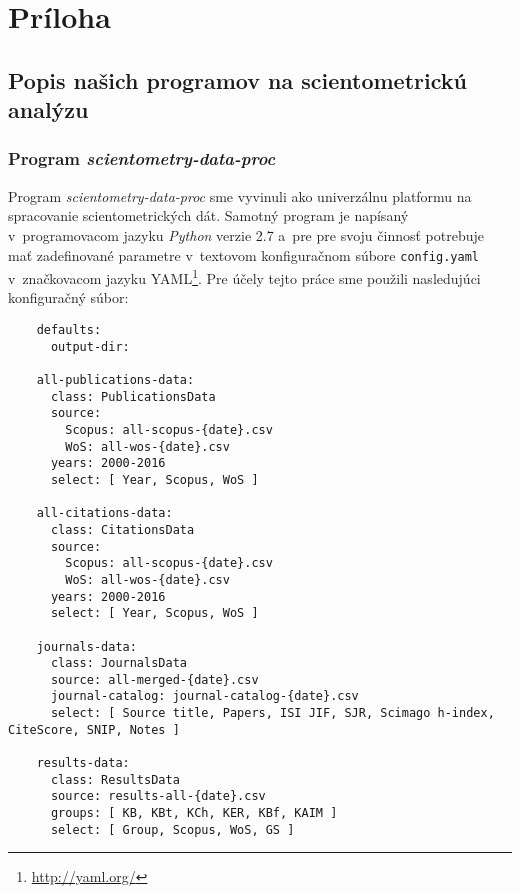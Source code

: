 \chapter*{Príloha}
\label{chap:appendix}

\section*{Popis našich programov na scientometrickú analýzu}


\subsection*{Program \emph{scientometry-data-proc}}

Program \emph{scientometry-data-proc} sme vyvinuli ako univerzálnu platformu na
spracovanie scientometrických dát.  Samotný program je napísaný v~programovacom
jazyku \emph{Python} verzie 2.7 a~pre pre svoju činnosť potrebuje mať
zadefinované parametre v~textovom konfiguračnom súbore \verb|config.yaml|
v~značkovacom jazyku YAML\footnote{\url{http://yaml.org/}}.  Pre účely tejto
práce sme použili nasledujúci konfiguračný súbor:

\begin{source}
  \begin{verbatim}
    defaults:
      output-dir:

    all-publications-data:
      class: PublicationsData
      source:
        Scopus: all-scopus-{date}.csv
        WoS: all-wos-{date}.csv
      years: 2000-2016
      select: [ Year, Scopus, WoS ]

    all-citations-data:
      class: CitationsData
      source:
        Scopus: all-scopus-{date}.csv
        WoS: all-wos-{date}.csv
      years: 2000-2016
      select: [ Year, Scopus, WoS ]

    journals-data:
      class: JournalsData
      source: all-merged-{date}.csv
      journal-catalog: journal-catalog-{date}.csv
      select: [ Source title, Papers, ISI JIF, SJR, Scimago h-index, CiteScore, SNIP, Notes ]

    results-data:
      class: ResultsData
      source: results-all-{date}.csv
      groups: [ KB, KBt, KCh, KER, KBf, KAIM ]
      select: [ Group, Scopus, WoS, GS ]
  \end{verbatim}
\end{source}

